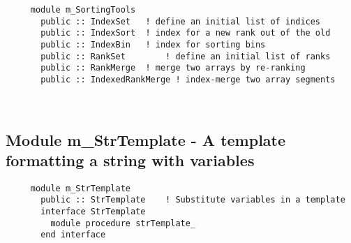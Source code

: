 \begin{verbatim} 
     module m_SortingTools
       public :: IndexSet	! define an initial list of indices
       public :: IndexSort	! index for a new rank out of the old
       public :: IndexBin	! index for sorting bins
       public :: RankSet		! define an initial list of ranks
       public :: RankMerge	! merge two arrays by re-ranking
       public :: IndexedRankMerge ! index-merge two array segments
\end{verbatim}
%


 
 
\mbox{}\hrulefill\ 
 

  \subsection{Module m\_StrTemplate - A template formatting a string with variables }

\begin{verbatim} 
     module m_StrTemplate
       public :: StrTemplate	! Substitute variables in a template
       interface StrTemplate
         module procedure strTemplate_
       end interface
 \end{verbatim}%
 
